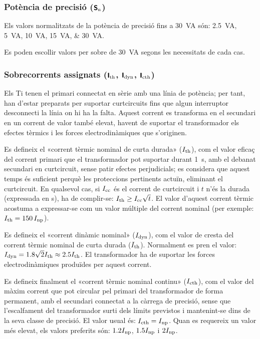 \subsubsection{Potència de precisió (${\boldsymbol{\mathsf{S_\text{n}}}}$)}

 Els valors normalitzats de la potència de precisió fins a \qty{30}{VA}
són: \qtylist{2,5; 5;10; 15; 30}{VA}.

Es poden escollir valors per sobre de \qty{30}{VA} segons les necessitats de cada cas.

\subsubsection{Sobrecorrents  assignats (${\boldsymbol{\mathsf{I_\text{th}}}}$, ${\boldsymbol{\mathsf{I_\text{dyn}}}}$, ${\boldsymbol{\mathsf{I_\text{cth}}}}$)}

 Els Ti
tenen el primari connectat en sèrie amb una línia de potència; per tant, han
d'estar preparats per suportar curtcircuits fins que algun
interruptor desconnecti la línia on hi ha la falta. Aquest
corrent es transforma en el secundari en un corrent de valor
també elevat, havent de suportar el transformador els efectes tèrmics
i les forces electrodinàmiques que s'originen.

Es defineix el «corrent tèrmic nominal de curta durada»
($I_\mathrm{th}$), com el valor eficaç del  corrent primari que el
transformador pot suportar durant \qty{1}{s}, amb el debanat
secundari en curtcircuit, sense patir efectes perjudicials; es
considera que aquest temps és suficient perquè les proteccions
pertinents actuïn, eliminant el curtcircuit. En qualsevol cas, si
$I_\mathrm{cc}$ és el corrent de curtcircuit i $t$ n'és la durada
(expressada en s), ha de complir-se: $I_\mathrm{th}\geq
I_\mathrm{cc}\sqrt{t}$. El valor d'aquest corrent tèrmic
acostuma a expressar-se com  un valor múltiple del corrent
nominal (per exemple: $I_\mathrm{th}=150\,I_\mathrm{np}$).

Es defineix el «corrent dinàmic nominal» ($I_\mathrm{dyn}$), com el
valor de cresta del corrent tèrmic nominal de curta durada ($I_\mathrm{th}$).
Normalment es pren el valor: $I_\mathrm{dyn} =
\num{1,8}\sqrt{2}I_\mathrm{th}\approx \num{2,5}I_\mathrm{th}$. El transformador ha de
suportar les forces electrodinàmiques produïdes per aquest corrent.

Es defineix finalment el «corrent tèrmic nominal continu» ($I_\mathrm{cth}$), com
el valor del màxim corrent que pot circular pel primari del
transformador  de forma permanent, amb el secundari connectat a la
càrrega de precisió, sense que l'escalfament del transformador surti
dels límits previstos i mantenint-se dins de la
seva classe de precisió. El valor usual és: $I_\mathrm{cth} = I_\mathrm{np}$. Quan es requereix un valor més elevat, els valors preferits són:
$\num{1,2}I_\mathrm{np}$, $\num{1,5}I_\mathrm{np}$ i $2 I_\mathrm{np}$.

